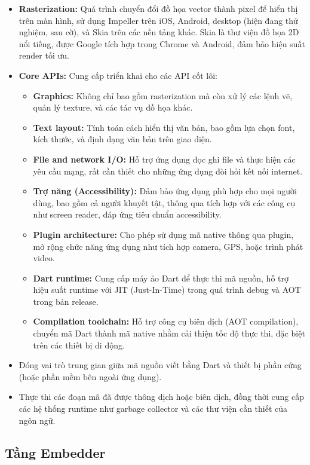 \documentclass[../DoAn.tex]{subfiles}
\numberwithin{figure}{chapter}
\begin{document}
\begin{itemize}
    \item \textbf{Rasterization:} Quá trình chuyển đổi đồ họa vector thành pixel để hiển thị trên màn hình, sử dụng Impeller trên iOS, Android, desktop (hiện đang thử nghiệm, sau cờ), và Skia trên các nền tảng khác. Skia là thư viện đồ họa 2D nổi tiếng, được Google tích hợp trong Chrome và Android, đảm bảo hiệu suất render tối ưu.
    \item \textbf{Core APIs:} Cung cấp triển khai cho các API cốt lõi:
    \begin{itemize}
        \item \textbf{Graphics:} Không chỉ bao gồm rasterization mà còn xử lý các lệnh vẽ, quản lý texture, và các tác vụ đồ họa khác.
        \item \textbf{Text layout:} Tính toán cách hiển thị văn bản, bao gồm lựa chọn font, kích thước, và định dạng văn bản trên giao diện.
        \item \textbf{File and network I/O:} Hỗ trợ ứng dụng đọc ghi file và thực hiện các yêu cầu mạng, rất cần thiết cho những ứng dụng đòi hỏi kết nối internet.
        \item \textbf{Trợ năng (Accessibility):} Đảm bảo ứng dụng phù hợp cho mọi người dùng, bao gồm cả người khuyết tật, thông qua tích hợp với các công cụ như screen reader, đáp ứng tiêu chuẩn accessibility.
        \item \textbf{Plugin architecture:} Cho phép sử dụng mã native thông qua plugin, mở rộng chức năng ứng dụng như tích hợp camera, GPS, hoặc trình phát video.
        \item \textbf{Dart runtime:} Cung cấp máy ảo Dart để thực thi mã nguồn, hỗ trợ hiệu suất runtime với JIT (Just-In-Time) trong quá trình debug và AOT trong bản release.
        \item \textbf{Compilation toolchain:} Hỗ trợ công cụ biên dịch (AOT compilation), chuyển mã Dart thành mã native nhằm cải thiện tốc độ thực thi, đặc biệt trên các thiết bị di động.
    \end{itemize}
    \item Đóng vai trò trung gian giữa mã nguồn viết bằng Dart và thiết bị phần cứng (hoặc phần mềm bên ngoài ứng dụng).
    \item Thực thi các đoạn mã đã được thông dịch hoặc biên dịch, đồng thời cung cấp các hệ thống runtime như garbage collector và các thư viện cần thiết của ngôn ngữ.
\end{itemize}
\subsection{Tầng Embedder} 
\end{document}
